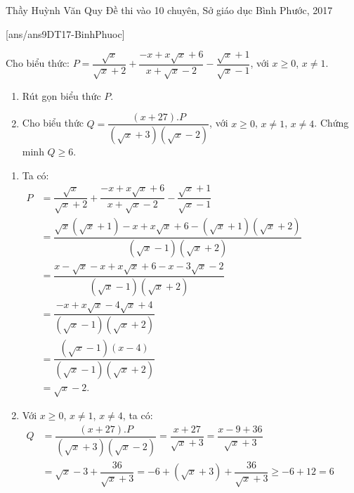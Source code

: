 \begin{name}
{Thầy  Huỳnh Văn Quy}
{Đề thi vào 10 chuyên, Sở giáo dục Bình Phước, 2017}
\end{name}
\setcounter{ex}{0}
[ans/ans9DT17-BinhPhuoc]
\begin{ex}%
    Cho biểu thức: $P=\dfrac{\sqrt{x}}{\sqrt{x}+2}+\dfrac{-x+x\sqrt{x}+6}{x+\sqrt{x}-2}-\dfrac{\sqrt{x}+1}{\sqrt{x}-1}$, với $x\geq0$, $x\ne1$.
    \begin{enumerate}
        \item Rút gọn biểu thức $P$.
        \item Cho biểu thức $Q=\dfrac{(x+27).P}{(\sqrt{x}+3)(\sqrt{x}-2)}$, với $x\geq0$, $x\ne1$, $x\ne4$. Chứng minh $Q\geq6$.
    \end{enumerate}
\loigiai
    {
    \begin{enumerate}
        \item Ta có:\\
        $\begin{aligned}
        P&=\dfrac{\sqrt{x}}{\sqrt{x}+2}+\dfrac{-x+x\sqrt{x}+6}{x+\sqrt{x}-2}-\dfrac{\sqrt{x}+1}{\sqrt{x}-1}\\
        &=\dfrac{\sqrt{x}(\sqrt{x}+1)-x+x\sqrt{x}+6-(\sqrt{x}+1)(\sqrt{x}+2)}{(\sqrt{x}-1)(\sqrt{x}+2)}\\
        &=\dfrac{x-\sqrt{x}-x+x\sqrt{x}+6-x-3\sqrt{x}-2}{(\sqrt{x}-1)(\sqrt{x}+2)}\\
        &=\dfrac{-x+x\sqrt{x}-4\sqrt{x}+4}{(\sqrt{x}-1)(\sqrt{x}+2)}\\
        &=\dfrac{(\sqrt{x}-1)(x-4)}{(\sqrt{x}-1)(\sqrt{x}+2)}\\
        &=\sqrt{x}-2.
        \end{aligned}$
        \item Với $x\geq0$, $x\ne1$, $x\ne4$, ta có:\\
        $\begin{aligned}
		Q&=\dfrac{(x+27).P}{(\sqrt{x}+3)(\sqrt{x}-2)}=\dfrac{x+27}{\sqrt{x}+3}=\dfrac{x-9+36}{\sqrt{x}+3}\\
		&=\sqrt{x}-3+\dfrac{36}{\sqrt{x}+3}=-6+(\sqrt{x}+3)+\dfrac{36}{\sqrt{x}+3}\geq-6+12=6
        \end{aligned}$
    \end{enumerate}
    }
\end{ex}

